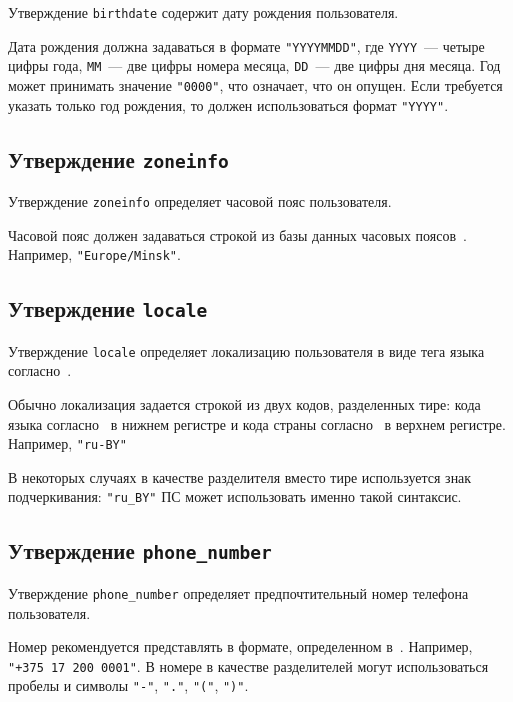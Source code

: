 Утверждение \lstinline{birthdate} содержит дату рождения пользователя. 

Дата рождения должна задаваться в формате \lstinline{"YYYYMMDD"},
где \lstinline{YYYY}~--- четыре цифры года, \lstinline{MM}~--- две цифры номера 
месяца, \lstinline{DD}~--- две цифры дня месяца.
%
Год может принимать значение \lstinline{"0000"}, что означает, что он опущен. 
%
Если требуется указать только год рождения, то должен использоваться формат 
\lstinline{"YYYY"}. 

\subsection{Утверждение \lstinline{zoneinfo}}\label{CLAIMS.ZoneInfo}

Утверждение \lstinline{zoneinfo} определяет часовой пояс пользователя.

Часовой пояс должен задаваться строкой из базы данных часовых 
поясов~\cite{RFC6557}. Например, \lstinline{"Europe/Minsk"}.

\subsection{Утверждение \lstinline{locale}}\label{CLAIMS.Locale}

Утверждение \lstinline{locale} определяет локализацию пользователя
в виде тега языка согласно~\cite{RFC5646}.

Обычно локализация задается строкой из двух кодов, разделенных тире: 
кода языка согласно~\cite{ISO639-1} в нижнем регистре и кода страны 
согласно~\cite{ISO3166-1} в верхнем регистре.
%
Например, \lstinline{"ru-BY"} 

В некоторых случаях в качестве разделителя вместо тире используется знак 
подчеркивания: \lstinline{"ru_BY"} ПС может использовать именно 
такой синтаксис.

\subsection{Утверждение \lstinline{phone_number}}\label{CLAIMS.PhoneNumber}

Утверждение \lstinline{phone_number} определяет предпочтительный номер телефона 
пользователя.

Номер рекомендуется представлять в формате, определенном в~\cite{E-164}. 
Например, \lstinline{"+375 17 200 0001"}. 
%
В номере в качестве разделителей могут использоваться пробелы и символы
\lstinline{"-"}, \lstinline{"."}, \lstinline{"("}, \lstinline{")"}.

